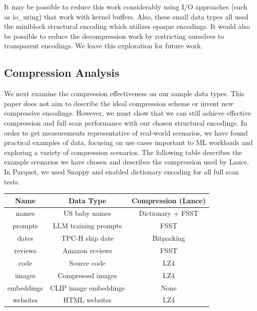 \documentclass[sigconf, nonacm]{acmart}
\begin{document}
It may be possible to reduce this work considerably using I/O approaches (such as io\_uring) that work with kernel buffers.  Also, these small data types all used the miniblock structural encoding which utilizes opaque encodings.  It would also be possible to reduce the decompression work by restricting ourselves to transparent encodings.  We leave this exploration for future work.

\subsection{Compression Analysis} \label{compression}

We next examine the compression effectiveness on our sample data types.  This paper does not aim to describe the ideal compression scheme or invent new compressive encodings.  However, we must show that we can still achieve effective compression and full scan performance with our chosen structural encodings.  In order to get measurements representative of real-world scenarios, we have found practical examples of data, focusing on use cases important to ML workloads and exploring a variety of compression scenarios.  The following table describes the example scenarios we have chosen and describes the compression used by Lance.  In Parquet, we used Snappy and enabled dictionary encoding for all full scan tests.

\begin{center}
\begin{tabular}{|c c c|}
\hline
Name & Data Type & Compression (Lance) \\
\hline
\hline
names & US baby names \cite{BabyNames} & Dictionary + FSST \\
\hline
prompts & LLM training prompts \cite{UltraChat} & FSST \\
\hline
dates & TPC-H ship date & Bitpacking \\
\hline
reviews & Amazon reviews \cite{AmazonReviews} & FSST \\
\hline
code & Source code \cite{GithubCode} & LZ4 \\
\hline
images & Compressed images \cite{TakaraImages} & LZ4 \\
\hline
embeddings & CLIP image embeddings \cite{Laion5b} & None \\
\hline
websites & HTML websites \cite{CommonCrawl} & LZ4 \\
\hline
\end{tabular}
\end{center}
\end{document}

